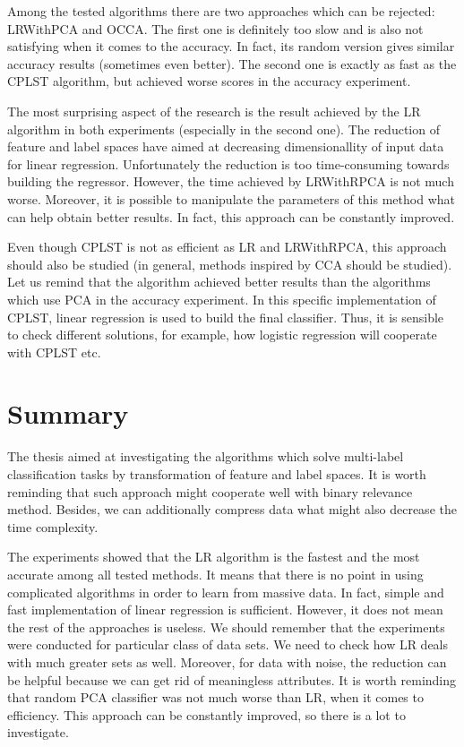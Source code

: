 Among the tested algorithms there are two approaches which can be rejected: LRWithPCA and OCCA. The first one is definitely too slow and is also not satisfying when it comes to the accuracy. In fact, its random version gives similar accuracy results (sometimes even better). The second one is exactly as fast as the CPLST algorithm, but achieved worse scores in the accuracy experiment. 

The most surprising aspect of the research is the result achieved by the LR algorithm in both experiments (especially in the second one). The reduction of feature and label spaces have aimed at decreasing dimensionallity of input data for linear regression. Unfortunately the reduction is too time-consuming towards building the regressor. However, the time achieved by LRWithRPCA is not much worse. Moreover, it is possible to manipulate the parameters of this method what can help obtain better results. In fact, this approach can be constantly improved.   

Even though CPLST is not as efficient as LR and LRWithRPCA, this approach should also be studied (in general, methods inspired by CCA should be studied). Let us remind that the algorithm achieved better results than the algorithms which use PCA in the accuracy experiment. In this specific implementation of CPLST, linear regression is used to build the final classifier. Thus, it is sensible to check different solutions, for example, how logistic regression will cooperate with CPLST etc.

\section{Summary}

The thesis aimed at investigating the algorithms which solve multi-label classification tasks by transformation of feature and label spaces. It is worth reminding that such approach might cooperate well with binary relevance method. Besides, we can additionally compress data what might also decrease the time complexity. 

The experiments showed that the LR algorithm is the fastest and the most accurate among all tested methods. It means that there is no point in using complicated algorithms in order to learn from massive data. In fact, simple and fast implementation of linear regression is sufficient. However, it does not mean the rest of the approaches is useless. We should remember that the experiments were conducted for particular class of data sets. We need to check how LR deals with much greater sets as well. Moreover, for data with noise, the reduction can be helpful because we can get rid of meaningless attributes. It is worth reminding that random PCA classifier was not much worse than LR, when it comes to efficiency. This approach can be constantly improved, so there is a lot to investigate.

